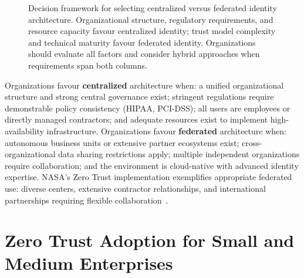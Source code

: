 \documentclass[journal]{IEEEtran}
\begin{document}
\begin{figure}[!t]
\caption{Decision framework for selecting centralized versus federated identity
  architecture. Organizational structure, regulatory requirements, and resource capacity
  favour centralized identity; trust model complexity and technical maturity favour
  federated identity. Organizations should evaluate all factors and consider hybrid
  approaches when requirements span both columns.}
\label{fig:identity_decision}
\end{figure}

Organizations favour \textbf{centralized} architecture when: a unified organizational
structure and strong central governance exist; stringent regulations require demonstrable
policy consistency (HIPAA, PCI-DSS); all users are employees or directly managed
contractors; and adequate resources exist to implement high-availability infrastructure.
Organizations favour \textbf{federated} architecture when: autonomous business units or
extensive partner ecosystems exist; cross-organizational data sharing restrictions apply;
multiple independent organizations require collaboration; and the environment is
cloud-native with advanced identity expertise. NASA's Zero Trust implementation
exemplifies appropriate federated use: diverse centers, extensive contractor
relationships, and international partnerships requiring flexible
collaboration~\cite{pingidentity2024}.

\section{Zero Trust Adoption for Small and Medium Enterprises}
\end{document}
